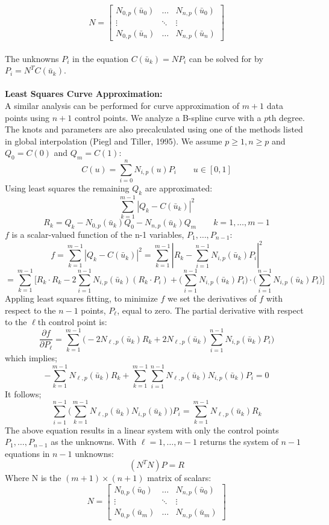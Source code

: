 \documentclass[11pt]{article}
\begin{document}
$$N = \left[\begin{array}{ccc}
  N_{0,p}(\bar{u}_0) & \ldots & N_{n,p}(\bar{u}_0) \\
   \vdots& \ddots & \vdots \\
  N_{0,p}(\bar{u}_{n}) & \ldots & N_{n,p}(\bar{u}_{n})
\end{array}\right]$$
\\
The unknowns $P_i$ in the equation $C(\bar{u}_k) = NP_i$ can be solved for by $P_i = N^TC(\bar{u}_k)$.
\\
\\
\textbf{Least Squares Curve Approximation:}
\\
A similar analysis can be performed for curve approximation of $m+1$ data points using $n+1$ control points. We analyze a B-spline curve with a $p$th degree. The knots and parameters are also precalculated using one of the methods listed in global interpolation (Piegl and Tiller, 1995). We assume $p\geq 1, n\geq p$ and $Q_0 = C(0)$ and $Q_m = C(1)$:
$$ C(u) = \sum^n_{i=0} N_{i,p}(u)P_i \qquad u \in [0,1]$$
Using least squares the remaining $Q_k$ are approximated:
$$ \sum^{m-1}_{k=1} |Q_k - C(\bar{u}_k)|^2$$
$$ R_k = Q_k - N_{0,p}(\bar{u}_k)Q_0 - N_{n,p}(\bar{u}_k)Q_m \qquad k=1,\ldots, m-1$$
$f$ is a scalar-valued function of the n-1 variables, $P_1,\ldots, P_{n-1}$:
$$ f = \sum^{m-1}_{k=1} |Q_k - C(\bar{u}_k)|^2 = \sum^{m-1}_{k=1} |R_k - \sum^{n-1}_{i=1} N_{i,p}(\bar{u}_k) P_i |^2$$
$$= \sum^{m-1}_{k=1} \bigg[R_k\cdot R_k - 2\sum^{n-1}_{i=1} N_{i,p}(\bar{u}_k)(R_k\cdot P_i) + \bigg(\sum^{n-1}_{i=1} N_{i,p}(\bar{u}_k)P_i \bigg) \cdot \bigg(\sum^{n-1}_{i=1}N_{i,p}(\bar{u}_k)P_i \bigg) \bigg]$$
Appling least squares fitting, to minimize $f$ we set the derivatives of $f$ with respect to the $n-1$ points, $P_\ell$, equal to zero. The partial derivative with respect to the $\ell$th control point is:
$$\frac{\partial f}{\partial P_\ell} = \sum^{m-1}_{k=1} \bigg(-2N_{\ell,p}(\bar{u}_k)R_k + 2N_{\ell,p}(\bar{u}_k)\sum^{n-1}_{i=1}N_{i,p}(\bar{u}_k)P_i \bigg)$$
which implies;
$$ -\sum^{m-1}_{k=1}N_{\ell,p}(\bar{u}_k)R_k + \sum^{m-1}_{k=1} \sum^{n-1}_{i=1}N_{\ell,p}(\bar{u}_k)N_{i,p}(\bar{u}_k)P_i = 0$$
It follows;
$$ \sum^{n-1}_{i=1} \bigg(\sum^{m-1}_{k=1} N_{\ell,p}(\bar{u}_k) N_{i,p}(\bar{u}_k) \bigg)P_i = \sum^{m-1}_{k=1}N_{\ell,p}(\bar{u}_k)R_k$$
The above equation results in a linear system with only the control points $P_1,\ldots,P_{n-1}$ as the unknowns. With $\ell=1,\ldots,n-1$ returns the system of $n-1$ equations in $n-1$ unknowns:
$$(N^T N)P = R$$
Where N is the $(m+1)\times(n+1)$ matrix of scalars:
$$N = \left[\begin{array}{ccc}
  N_{0,p}(\bar{u}_0) & \ldots & N_{n,p}(\bar{u}_0) \\
   \vdots& \ddots & \vdots \\
  N_{0,p}(\bar{u}_{m}) & \ldots & N_{n,p}(\bar{u}_{m})
\end{array}\right]$$
\end{document}
